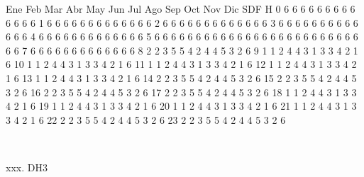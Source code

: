 \documentclass[a4paper,10pt]{article}
\begin{document}
\begin{Form}
    Ene  Feb  Mar  Abr  May  Jun  Jul  Ago  Sep  Oct  Nov  Dic  SDF
H                                                                  
0     6    6    6    6    6    6    6    6    6    6    6    6    6
1     6    6    6    6    6    6    6    6    6    6    6    6    6
2     6    6    6    6    6    6    6    6    6    6    6    6    6
3     6    6    6    6    6    6    6    6    6    6    6    6    6
4     6    6    6    6    6    6    6    6    6    6    6    6    6
5     6    6    6    6    6    6    6    6    6    6    6    6    6
6     6    6    6    6    6    6    6    6    6    6    6    6    6
7     6    6    6    6    6    6    6    6    6    6    6    6    6
8     2    2    3    5    5    4    2    4    4    5    3    2    6
9     1    1    2    4    4    3    1    3    3    4    2    1    6
10    1    1    2    4    4    3    1    3    3    4    2    1    6
11    1    1    2    4    4    3    1    3    3    4    2    1    6
12    1    1    2    4    4    3    1    3    3    4    2    1    6
13    1    1    2    4    4    3    1    3    3    4    2    1    6
14    2    2    3    5    5    4    2    4    4    5    3    2    6
15    2    2    3    5    5    4    2    4    4    5    3    2    6
16    2    2    3    5    5    4    2    4    4    5    3    2    6
17    2    2    3    5    5    4    2    4    4    5    3    2    6
18    1    1    2    4    4    3    1    3    3    4    2    1    6
19    1    1    2    4    4    3    1    3    3    4    2    1    6
20    1    1    2    4    4    3    1    3    3    4    2    1    6
21    1    1    2    4    4    3    1    3    3    4    2    1    6
22    2    2    3    5    5    4    2    4    4    5    3    2    6
23    2    2    3    5    5    4    2    4    4    5    3    2    6

\

xxx. DH3


\end{Form}
\end{document}
